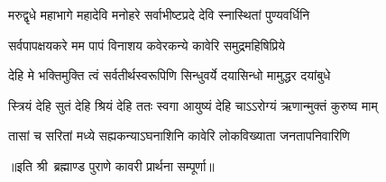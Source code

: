 

\twolineshloka
{मरुद्वृधे महाभागे महादेवि मनोहरे}
{सर्वाभीष्टप्रदे देवि स्नास्थितां पुण्यवर्धिनि}%

\twolineshloka
{सर्वपापक्षयकरे मम पापं विनाशय}
{कवेरकन्ये कावेरि समुद्रमहिषिप्रिये}%

\twolineshloka
{देहि मे भक्तिमुक्ति त्वं सर्वतीर्थस्वरूपिणि}
{सिन्धुवर्ये दयासिन्धो मामुद्धर दयांबुधे}%

\twolineshloka
{स्त्रियं देहि सुतं देहि श्रियं देहि ततः स्वगा}
{आयुष्यं देहि चाऽऽरोग्यं ऋणान्मुक्तं कुरुष्व माम्}%

\twolineshloka
{तासां च सरितां मध्ये सह्यकन्याऽघनाशिनि}
{कावेरि लोकविख्याता जनतापनिवारिणि}%

॥इति श्री~ब्रह्माण्ड पुराणे कावरी प्रार्थना सम्पूर्णा॥